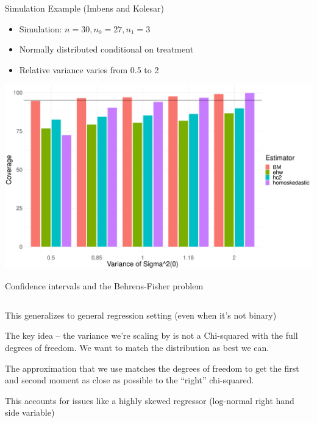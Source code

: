 \documentclass[notes,11pt, aspectratio=169]{beamer}
\newenvironment{wideitemize}{\itemize\addtolength{\itemsep}{10pt}}{\enditemize}
\begin{document}
\begin{frame}{Simulation Example (Imbens and Kolesar)}
  \begin{itemize}
  \item Simulation: $n=30, n_{0} = 27, n_{1} = 3$
  \item Normally distributed conditional on treatment
  \item Relative variance varies from 0.5 to 2
  \end{itemize}
  \begin{center}
  \includegraphics[width=0.7\linewidth]{imbenskolesar_coverage.pdf}
  \end{center}
\end{frame}


\begin{frame}{Confidence intervals and the Behrens-Fisher problem}
\begin{columns}[T] %
\begin{column}{.8\textwidth}
  \begin{wideitemize}
  \item This generalizes to general regression setting (even when it's not binary)
  \item The key idea -- the variance we're scaling by is not a
    Chi-squared with the full degrees of freedom. We want to match the distribution as best we can.
  \item The approximation that we use matches the degrees of freedom
    to get the first and second moment as close as possible to the ``right'' chi-squared.
  \item This accounts for issues like a highly skewed regressor
    (log-normal right hand side variable)
  \end{wideitemize}
  \end{column}%
  \hfill%
  \begin{column}{.5\textwidth}
  \end{column}
\end{columns}
\end{frame}
\end{document}
